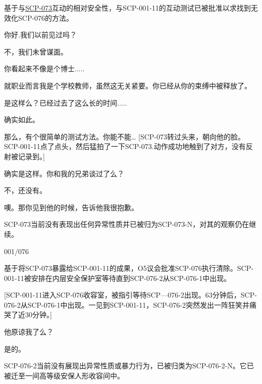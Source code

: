 \begin{scpbox}

基于与\hyperref[chap:SCP-073]{SCP-073}互动的相对安全性，与SCP-001-11的互动测试已被批准以求找到无效化SCP-076的方法。

\begin{scpbox}


 你好.我们以前见过吗？

 不，我们未曾谋面。

 你看起来不像是个博士.....

 就职业而言我是个学校教师，虽然这无关紧要。你已经从你的束缚中被释放了。

 是这样么？已经过去了这么长的时间.....

 确实如此。

 那么，有个很简单的测试方法。你能不能… [SCP-073转过头来，朝向他的脸。SCP-001-11点了点头，然后猛拍了一下SCP-073.动作成功地触到了对方，没有反射被记录到。]

 确实是这样。你和我的兄弟谈过了么？

 不，还没有。

 噢。那你见到他的时候，告诉他我很抱歉。


\end{scpbox}

 SCP-073当前没有表现出任何异常性质并已被归为SCP-073-N，对其的观察仍在继续。

\end{scpbox}

001/076

\begin{scpbox}

 基于将SCP-073暴露给SCP-001-11的成果，O5议会批准SCP-076执行清除。SCP-001-11被安排在内层安全保护室等待直到SCP-076-2从SCP-076-1中出现。

\begin{scpbox}


[SCP-001-11进入SCP-076收容室，被指引等待SCP—076-2出现。63分钟后，SCP-076-2从SCP-076-1中出现。一见到SCP-001-11，SCP-076-2突然发出一阵狂笑并痛哭了近30分钟。]

他原谅我了么？

 是的。


\end{scpbox}

SCP-076-2当前没有展现出异常性质或暴力行为，已被归类为SCP-076-2-N。它已被迁至一间高等级安保人形收容间中。

\end{scpbox}

